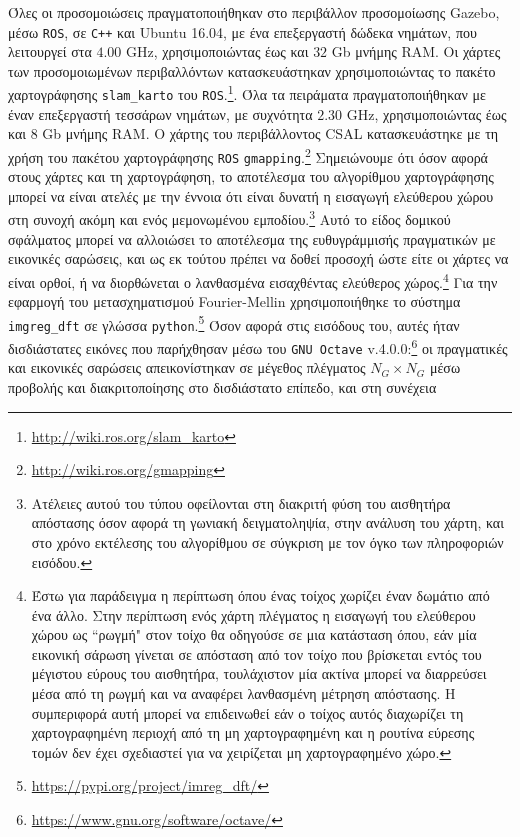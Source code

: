 Όλες οι προσομοιώσεις πραγματοποιήθηκαν στο περιβάλλον προσομοίωσης Gazebo,
μέσω \texttt{ROS}, σε \texttt{C++} και Ubuntu 16.04, με ένα επεξεργαστή δώδεκα
νημάτων, που λειτουργεί στα $4.00$ GHz, χρησιμοποιώντας έως και $32$ Gb μνήμης
RAM. Οι χάρτες των προσομοιωμένων περιβαλλόντων κατασκευάστηκαν χρησιμοποιώντας
το πακέτο χαρτογράφησης \texttt{slam\_karto} του
\texttt{ROS}.\footnote{\url{http://wiki.ros.org/slam\_karto}}. Όλα τα πειράματα
πραγματοποιήθηκαν με έναν επεξεργαστή τεσσάρων νημάτων, με συχνότητα $2.30$
GHz, χρησιμοποιώντας έως και $8$ Gb μνήμης RAM. Ο χάρτης του περιβάλλοντος CSAL
κατασκευάστηκε με τη χρήση του πακέτου χαρτογράφησης \texttt{ROS}
\texttt{gmapping}.\footnote{\url{http://wiki.ros.org/gmapping}} Σημειώνουμε ότι
όσον αφορά στους χάρτες και τη χαρτογράφηση, το αποτέλεσμα του αλγορίθμου
χαρτογράφησης μπορεί να είναι ατελές με την έννοια ότι είναι δυνατή η εισαγωγή
ελεύθερου χώρου στη συνοχή ακόμη και ενός μεμονωμένου
εμποδίου.\footnote{Ατέλειες αυτού του τύπου οφείλονται στη διακριτή φύση του
αισθητήρα απόστασης όσον αφορά τη γωνιακή δειγματοληψία, στην ανάλυση του
χάρτη, και στο χρόνο εκτέλεσης του αλγορίθμου σε σύγκριση με τον όγκο των
πληροφοριών εισόδου.} Αυτό το είδος δομικού σφάλματος μπορεί να αλλοιώσει το
αποτέλεσμα της ευθυγράμμισής πραγματικών με εικονικές σαρώσεις, και ως εκ τούτου
πρέπει να δοθεί προσοχή ώστε είτε οι χάρτες να είναι ορθοί, ή να διορθώνεται ο
λανθασμένα εισαχθέντας ελεύθερος χώρος.\footnote{Έστω για παράδειγμα η
περίπτωση όπου ένας τοίχος χωρίζει έναν δωμάτιο από ένα άλλο. Στην περίπτωση
ενός χάρτη πλέγματος η εισαγωγή του ελεύθερου χώρου ως ``ρωγμή" στον τοίχο θα
οδηγούσε σε μια κατάσταση όπου, εάν μία εικονική σάρωση γίνεται σε απόσταση από
τον τοίχο που βρίσκεται εντός του μέγιστου εύρους του αισθητήρα, τουλάχιστον
μία ακτίνα μπορεί να διαρρεύσει μέσα από τη ρωγμή και να αναφέρει λανθασμένη
μέτρηση απόστασης. Η συμπεριφορά αυτή μπορεί να επιδεινωθεί εάν ο τοίχος αυτός
διαχωρίζει τη χαρτογραφημένη περιοχή από τη μη χαρτογραφημένη και η ρουτίνα
εύρεσης τομών δεν έχει σχεδιαστεί για να χειρίζεται μη χαρτογραφημένο χώρο.}
Για την εφαρμογή του μετασχηματισμού Fourier-Mellin χρησιμοποιήθηκε το σύστημα
\texttt{imgreg\_dft} σε γλώσσα
\texttt{python}.\footnote{\url{https://pypi.org/project/imreg\_dft/}} Όσον
αφορά στις εισόδους του, αυτές ήταν δισδιάστατες εικόνες που παρήχθησαν μέσω
του \texttt{GNU Octave}
v.4.0.0:\footnote{\url{https://www.gnu.org/software/octave/}} οι πραγματικές
και εικονικές σαρώσεις απεικονίστηκαν σε μέγεθος πλέγματος $N_G \times N_G$
μέσω προβολής και διακριτοποίησης στο δισδιάστατο επίπεδο, και στη συνέχεια
